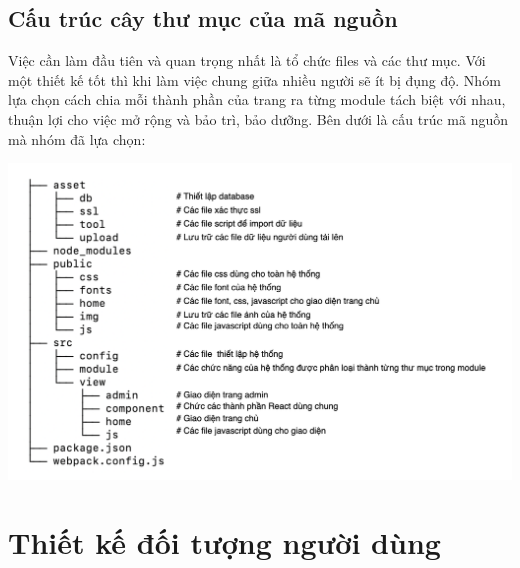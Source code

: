 \subsection{Cấu trúc cây thư mục của mã nguồn}
\indent Việc cần làm đầu tiên và quan trọng nhất là tổ chức files và các thư mục. Với một thiết kế tốt thì khi làm việc chung giữa nhiều người sẽ ít bị đụng độ. Nhóm lựa chọn cách chia mỗi thành phần của trang ra từng module tách biệt với nhau, thuận lợi cho việc mở rộng và bảo trì, bảo dưỡng. Bên dưới là cấu trúc mã nguồn mà nhóm đã lựa chọn:
\begin{center}
  \captionsetup{type=figure}
  \includegraphics[width=15cm]{img/tree.png}
\end{center}
\section{Thiết kế đối tượng người dùng}
